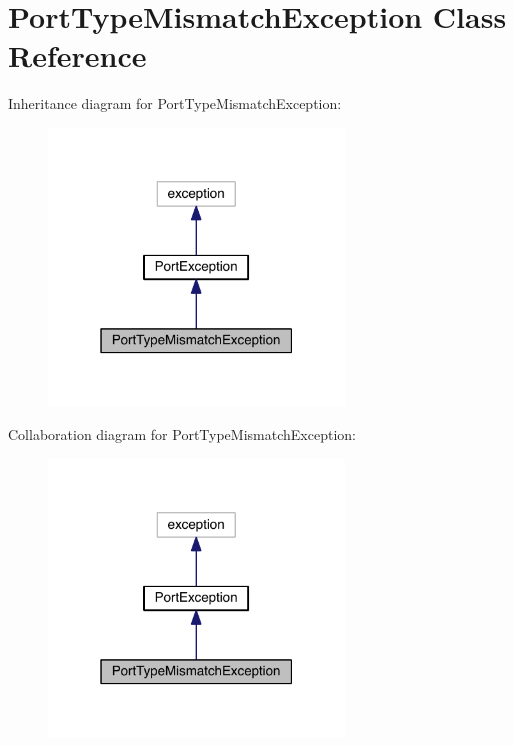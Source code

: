 \hypertarget{class_port_type_mismatch_exception}{}\section{Port\+Type\+Mismatch\+Exception Class Reference}
\label{class_port_type_mismatch_exception}


Inheritance diagram for Port\+Type\+Mismatch\+Exception\+:
\nopagebreak
\begin{figure}[H]
\begin{center}
\leavevmode
\includegraphics[width=223pt]{class_port_type_mismatch_exception__inherit__graph}
\end{center}
\end{figure}


Collaboration diagram for Port\+Type\+Mismatch\+Exception\+:
\nopagebreak
\begin{figure}[H]
\begin{center}
\leavevmode
\includegraphics[width=223pt]{class_port_type_mismatch_exception__coll__graph}
\end{center}
\end{figure}
